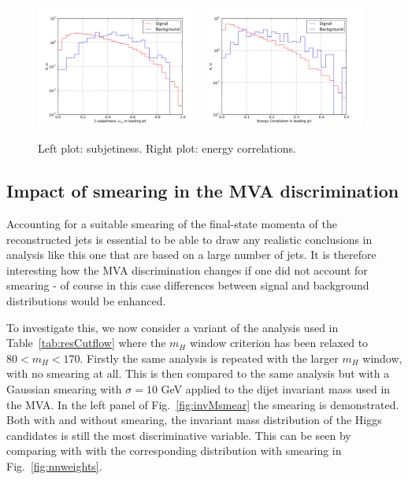 \begin{figure}[t]
\begin{center}
  \includegraphics[width=0.48\textwidth]{plots/tau21_H0_res_C1_boost.pdf}
  \includegraphics[width=0.48\textwidth]{plots/EEC_C2_H0_res_C1_boost.pdf}
  \caption{\small Left plot: subjetiness.
    Right plot: energy correlations.
}
\label{fig:mva_substructure_1}
\end{center}
\end{figure}



\subsection{Impact of smearing in the MVA discrimination}

Accounting for a suitable smearing of the final-state momenta of the reconstructed
jets is essential to be able to draw any realistic conclusions in analysis like
this one that are based on a large number of jets.
%
It is therefore interesting how the MVA discrimination changes if one did not account
for smearing - of course in this case differences between signal and background distributions
would be enhanced.

To investigate this, we now consider a variant of the analysis used in
Table~\ref{tab:resCutflow} where the $m_H$ window criterion has been relaxed to $80 < m_H < 170$.
%
Firstly the same analysis is repeated with the larger $m_H$ window, with no smearing at all.
%
This is then compared to the same analysis but with a Gaussian smearing with $\sigma=10$ GeV applied to the dijet invariant mass used in the MVA.
%
In the left panel of Fig.~\ref{fig:invMsmear} the smearing is demonstrated.
%
Both with and without smearing, the  invariant mass distribution of the
Higgs candidates is still the most discriminative variable.
%
This can be seen by comparing with   with the corresponding distribution with smearing in
  Fig.~\ref{fig:nnweights}.




